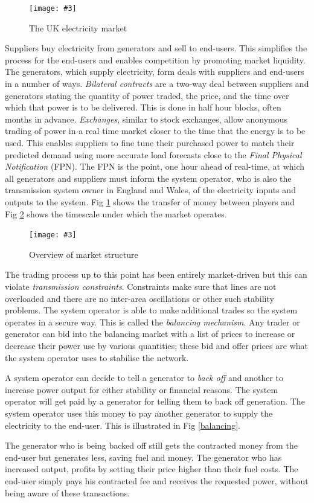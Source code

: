 \documentclass[a4paper,oneside,12pt]{report}
\newcommand{\image}[3] {
  \begin{figure}
    \begin{center}
      \texttt{[image: \#3]}
      \caption{#2}
      \label{#1}
    \end{center}
  \end{figure}
}
\begin{document}
\image{economicstructure}{The UK electricity market}{economicstructure.png}

Suppliers buy electricity from generators and sell to end-users. This simplifies the process for the end-users and enables competition by promoting market liquidity. The generators, which supply electricity, form deals with suppliers and end-users in a number of ways. \emph{Bilateral contracts} are a two-way deal between suppliers and generators stating the quantity of power traded, the price, and the time over which that power is to be delivered. This is done in half hour blocks, often months in advance. \emph{Exchanges}, similar to stock exchanges, allow anonymous trading of power in a real time market closer to the time that the energy is to be used. This enables suppliers to fine tune their purchased power to match their predicted demand using more accurate load forecasts close to the \emph{Final Physical Notification} (FPN). The FPN is the point, one hour ahead of real-time, at which all generators and suppliers must inform the system operator, who is also the transmission system owner in England and Wales, of the electricity inputs and outputs to the system. Fig \ref{economicstructure} shows the transfer of money between players and Fig \ref{ukmarket} shows the timescale under which the market operates.

\image{ukmarket}{Overview of market structure}{ukmarket.png}

The trading process up to this point has been entirely market-driven but this can violate \emph{transmission constraints}. Constraints make sure that lines are not overloaded and there are no inter-area oscillations or other such stability problems. The system operator is able to make additional trades so the system operates in a secure way. This is called the \emph{balancing mechanism}. Any trader or generator can bid into the balancing market with a list of prices to increase or decrease their power use by various quantities; these bid and offer prices are what the system operator uses to stabilise the network.

A system operator can decide to tell a generator to \emph{back off} and another to increase power output for either stability or financial reasons. The system operator will get paid by a generator for telling them to back off generation. The system operator uses this money to pay another generator to supply the electricity to the end-user. This is illustrated in Fig \ref{balancing}.

The generator who is being backed off still gets the contracted money from the end-user but generates less, saving fuel and money. The generator who has increased output, profits by setting their price higher than their fuel costs. The end-user simply pays his contracted fee and receives the requested power, without being aware of these transactions.
\end{document}
